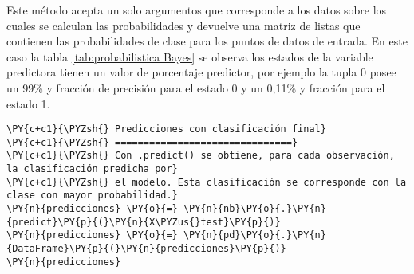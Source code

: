 \begin{table}[H]
\centering
\setlength{\tabcolsep}{5pt}
\caption{Predicciones probabilísticas para cada observación Bayes}
\label{tab:probabilistica Bayes}
\end{table}
        
    Este método acepta un solo argumentos que corresponde a los datos sobre
los cuales se calculan las probabilidades y devuelve una matriz de
listas que contienen las probabilidades de clase para los puntos de
datos de entrada. En este caso la tabla \ref{tab:probabilistica Bayes} se observa los
estados de la variable predictora tienen un valor de porcentaje
predictor, por ejemplo la tupla 0 posee un 99\% y fracción de precisión
para el estado 0 y un 0,11\% y fracción para el estado 1.

    \begin{tcolorbox}[breakable, size=fbox, boxrule=1pt, pad at break*=1mm,colback=cellbackground, colframe=cellborder]
\begin{Verbatim}[commandchars=\\\{\}]
\PY{c+c1}{\PYZsh{} Predicciones con clasificación final}
\PY{c+c1}{\PYZsh{} ===============================}
\PY{c+c1}{\PYZsh{} Con .predict() se obtiene, para cada observación, la clasificación predicha por}
\PY{c+c1}{\PYZsh{} el modelo. Esta clasificación se corresponde con la clase con mayor probabilidad.}
\PY{n}{predicciones} \PY{o}{=} \PY{n}{nb}\PY{o}{.}\PY{n}{predict}\PY{p}{(}\PY{n}{X\PYZus{}test}\PY{p}{)}
\PY{n}{predicciones} \PY{o}{=} \PY{n}{pd}\PY{o}{.}\PY{n}{DataFrame}\PY{p}{(}\PY{n}{predicciones}\PY{p}{)}
\PY{n}{predicciones}
\end{Verbatim}
\end{tcolorbox}

